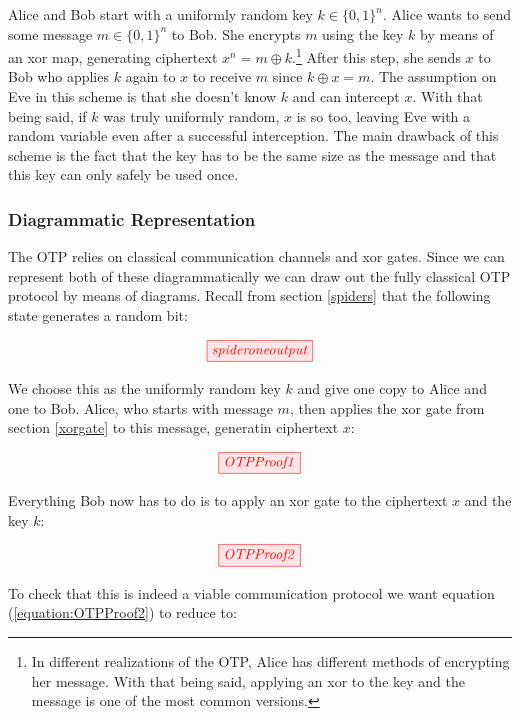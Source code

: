\documentclass[]{article}
\begin{document}
Alice and Bob start with a uniformly random key $k \in \{0,1\}^n$. Alice wants to send some message $m \in \{0,1\}^n$ to Bob. She encrypts $m$ using the key $k$ by means of an xor map, generating ciphertext $x^n = m \oplus k$.\footnote{In different realizations of the OTP, Alice has different methods of encrypting her message. With that being said, applying an xor to the key and the message is one of the most common versions.} After this step, she sends $x$ to Bob who applies $k$ again to $x$ to receive $m$ since $k \oplus x = m$. The assumption on Eve in this scheme is that she doesn't know $k$ and can intercept $x$. With that being said, if $k$ was truly uniformly random, $x$ is so too, leaving Eve with a random variable even after a successful interception. The main drawback of this scheme is the fact that the key has to be the same size as the message and that this key can only safely be used once.

\subsubsection{Diagrammatic Representation}

The OTP relies on classical communication channels and xor gates. Since we can represent both of these diagrammatically we can draw out the fully classical OTP protocol by means of diagrams. Recall from section \ref{spiders} that the following state generates a random bit:

\begin{equation}
	\tikzfig{spideroneoutput}
\end{equation}

We choose this as the uniformly random key $k$ and give one copy to Alice and one to Bob. Alice, who starts with message $m$, then applies the xor gate from section \ref{xorgate} to this message, generatin ciphertext $x$:

\begin{equation}
	\tikzfig{OTPProof1}
\end{equation}

Everything Bob now has to do is to apply an xor gate to the ciphertext $x$ and the key $k$:

\begin{equation}
\label{equation:OTPProof2}
\tikzfig{OTPProof2}
\end{equation}

To check that this is indeed a viable communication protocol we want equation (\ref{equation:OTPProof2}) to reduce to:
\end{document}
